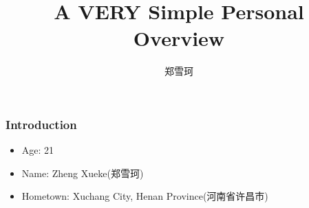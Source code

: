\documentclass{ctexbeamer}
\title{A VERY Simple Personal Overview}
\author{郑雪珂}
\begin{document}
\frame{\titlepage}
\begin{frame}
  \frametitle{Introduction}
\begin{itemize}
  \item Age: 21
  \item Name: Zheng Xueke(郑雪珂)
  \item Hometown: Xuchang City, Henan Province(河南省许昌市)
\end{itemize}
\end{frame}






\end{document}
